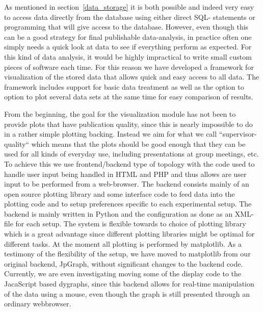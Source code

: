 As mentioned in section~\ref{data_storage} it is both possible and indeed very
easy to access data directly from the database using either direct SQL-
statements or programming that will give access to the database. However, even
though this can be a good strategy for final publishable data-analysis, in
practice often one simply needs a quick look at data to see if everything
perform as expected. For this kind of data analysis, it would be highly
impractical to write small custom pieces of software each time. For this reason
we have developed a framework for visualization of the stored data that allows
quick and easy access to all data. The framework includes support for basic
data treatment as well as the option to option to plot several data sets at the
same time for easy comparison of results.

From the beginning, the goal for the visualization module has not been to
provide plots that have publication quality, since this is nearly impossible to
do in a rather simple plotting backing. Instead we aim for what we call
``supervisor-quality`` which means that the plots should be good enough that
they can be used for all kinds of everyday use, including presentations at
group meetings, etc. To achieve this we use frontend/backend type of topology
with the code used to handle user input being handled in HTML and PHP and thus
allows are user input to be performed from a web-browser. The backend consists
mainly of an open source plotting library and some interface code to feed data
into the plotting code and to setup preferences specific to each experimental
setup. The backend is mainly written in Python\cite{python} and the
configuration as done as an XML-file for each setup. The system is flexible
towards to choice of plotting library which is a great advantage since
different plotting libraries might be optimal for different tasks. At the
moment all plotting is performed by matplotlib\cite{matplotlib}. As a testimony
of the flexibility of the setup, we have moved to matplotlib from our original
backend, JpGraph\cite{jpgraph}, without significant changes to the backend
code. Currently, we are even investigating moving some of the display code to
the JacaScript based dygraphs\cite{dygraphs}, since this backend allows for
real-time manipulation of the data using a mouse, even though the graph is
still presented through an ordinary webbrowser.
